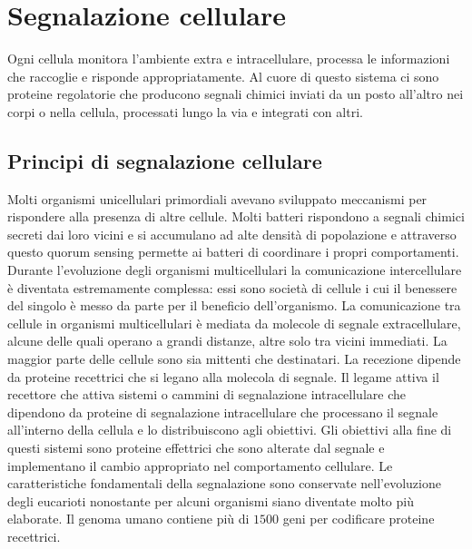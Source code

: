 \chapter{Segnalazione cellulare}
Ogni cellula monitora l'ambiente extra e intracellulare, processa le informazioni che raccoglie e risponde appropriatamente. Al cuore di questo sistema ci sono proteine regolatorie che
producono segnali chimici inviati da un posto all'altro nei corpi o nella cellula, processati lungo la via e integrati con altri. 
\section{Principi di segnalazione cellulare}
Molti organismi unicellulari primordiali avevano sviluppato meccanismi per rispondere alla presenza di altre cellule. Molti batteri rispondono a segnali chimici secreti dai loro vicini
e si accumulano ad alte densit\`a di popolazione e attraverso questo quorum sensing permette ai batteri di coordinare i propri comportamenti. Durante l'evoluzione degli organismi 
multicellulari la comunicazione intercellulare \`e diventata estremamente complessa: essi sono societ\`a di cellule i cui il benessere del singolo \`e messo da parte per il beneficio
dell'organismo. La comunicazione tra cellule in organismi multicellulari \`e mediata da molecole di segnale extracellulare, alcune delle quali operano a grandi distanze, altre solo tra
vicini immediati. La maggior parte delle cellule sono sia mittenti che destinatari. La recezione dipende da proteine recettrici che si legano alla molecola di segnale. Il legame
attiva il recettore che attiva sistemi o cammini di segnalazione intracellulare che dipendono da proteine di segnalazione intracellulare che processano il segnale all'interno
della cellula e lo distribuiscono agli obiettivi. Gli obiettivi alla fine di questi sistemi sono proteine effettrici che sono alterate dal segnale e implementano il cambio appropriato
nel comportamento cellulare. Le caratteristiche fondamentali della segnalazione sono conservate nell'evoluzione degli eucarioti nonostante per alcuni organismi siano diventate molto
pi\`u elaborate. Il genoma umano contiene pi\`u di $1500$ geni per codificare proteine recettrici. 

